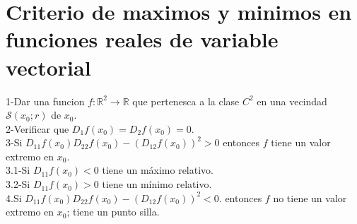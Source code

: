 \documentclass[10pt,a4paper]{article}
\begin{document}
\section{Criterio de maximos y minimos en funciones reales de variable vectorial}
1-Dar una funcion $f: \mathbb{R}^2 \rightarrow \mathbb{R} $ que pertenesca a la clase $C^2$ en una vecindad 
$ \mathscr{S} \left( x_0 ; r \right) $ de $x_0$. \\
2-Verificar que $D_1 f \left( x_0 \right) = D_2 f \left( x_0 \right) =0. $\\ 
3-Si $D_{11} f \left( x_0 \right) D_{22} f \left( x_0 \right) - \left( D_{12} f \left( x_0 \right)  \right)^2 >0 $ 
entonces $f$ tiene un valor extremo en $x_0$. \\
3.1-Si $D_{11} f \left( x_0 \right)<0  $ tiene un máximo relativo.  \\
3.2-Si $D_{11} f \left( x_0 \right)>0  $ tiene un mínimo relativo.  \\
4.Si $D_{11} f \left( x_0 \right) D_{2 2} f \left( x_0 \right) - \left( D_{12} f \left( x_0 \right)  \right) ^2 <0 $. 
entonces $f$ no tiene un valor extremo en $x_0$; tiene un punto silla.
\end{document}
